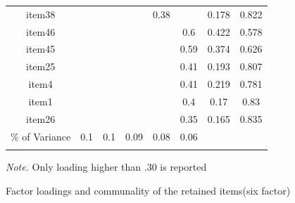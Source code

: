 \begin{appendix}
\begin{table}[tbp]
\begin{center}
\begin{threeparttable}
{\begin{tabular}{cccccccc}
item38 &  &  &  & 0.38 &  & 0.178 & 0.822\\
item46 &  &  &  &  & 0.6 & 0.422 & 0.578\\
item45 &  &  &  &  & 0.59 & 0.374 & 0.626\\
item25 &  &  &  &  & 0.41 & 0.193 & 0.807\\
item4 &  &  &  &  & 0.41 & 0.219 & 0.781\\
item1 &  &  &  &  & 0.4 & 0.17 & 0.83\\
item26 &  &  &  &  & 0.35 & 0.165 & 0.835\\
\% of Variance & 0.1 & 0.1 & 0.09 & 0.08 & 0.06 &  & \\
\bottomrule
\addlinespace
\end{tabular}

}

\begin{tablenotes}[para]
\normalsize{\textit{Note.} Only loading higher than .30 is reported}
\end{tablenotes}

\end{threeparttable}
\end{center}

\end{table}

\begin{table}[tbp]

\begin{center}
\begin{threeparttable}

\caption{\label{tab:sixFacTab}Factor loadings and communality of the retained items(six factor)}

\small{

}
\end{threeparttable}
\end{center}
\end{table}
\end{appendix}
